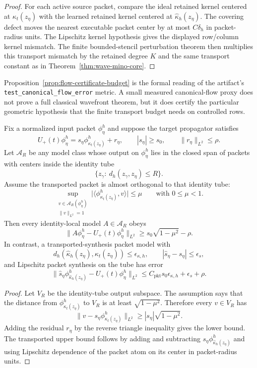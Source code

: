 \begin{proof}
For each active source packet, compare the ideal retained kernel centered at $\kappa_t(z_\eta)$ with the learned retained kernel centered at $\hat\kappa_h(z_\eta)$.  The covering defect moves the nearest executable packet center by at most $C\delta_h$ in packet-radius units.  The Lipschitz kernel hypothesis gives the displayed row/column kernel mismatch.  The finite bounded-stencil perturbation theorem then multiplies this transport mismatch by the retained degree $K$ and the same transport constant as in Theorem~\ref{thm:wave-mino-core}.
\end{proof}

Proposition~\ref{prop:flow-certificate-budget} is the formal reading of the artifact's \texttt{test\_canonical\_flow\_error} metric.  A small measured canonical-flow proxy does not prove a full classical wavefront theorem, but it does certify the particular geometric hypothesis that the finite transport budget needs on controlled rows.

\begin{proposition}
\label{prop:conditional-transport-advantage}
Fix a normalized input packet $\phi_\eta^h$ and suppose the target propagator satisfies
\[
U_+(t)\phi_\eta^h
=
s_\eta\phi_{\kappa_t(z_\eta)}^h+r_\eta,
\qquad
|s_\eta|\ge s_0,\qquad
\|r_\eta\|_{L^2}\le \rho .
\]
Let $\mathcal A_R$ be any model class whose output on $\phi_\eta^h$ lies in the closed span of packets with centers inside the identity tube
\[
\{z_\gamma:\ d_h(z_\gamma,z_\eta)\le R\}.
\]
Assume the transported packet is almost orthogonal to that identity tube:
\[
\sup_{\substack{v\in \mathcal A_R(\phi_\eta^h)\\ \|v\|_{L^2}=1}}
\bigl|\langle \phi_{\kappa_t(z_\eta)}^h,v\rangle\bigr|
\le \mu
\qquad
\text{with } 0\le\mu<1.
\]
Then every identity-local model $A\in\mathcal A_R$ obeys
\[
\|A\phi_\eta^h-U_+(t)\phi_\eta^h\|_{L^2}
\ge
s_0\sqrt{1-\mu^2}-\rho .
\]
In contrast, a transported-synthesis packet model with
\[
d_h(\hat\kappa_h(z_\eta),\kappa_t(z_\eta))\le\epsilon_{\kappa,h},
\qquad
|\hat s_\eta-s_\eta|\le \epsilon_s,
\]
and Lipschitz packet synthesis on the tube has error
\[
\|\hat s_\eta \phi_{\hat\kappa_h(z_\eta)}^h-U_+(t)\phi_\eta^h\|_{L^2}
\le
C_{\mathrm{pkt}}s_0\epsilon_{\kappa,h}
+
\epsilon_s
+
\rho .
\]
\end{proposition}

\begin{proof}
Let $V_R$ be the identity-tube output subspace.  The assumption says that the distance from $\phi_{\kappa_t(z_\eta)}^h$ to $V_R$ is at least $\sqrt{1-\mu^2}$.  Therefore every $v\in V_R$ has
\[
\|v-s_\eta\phi_{\kappa_t(z_\eta)}^h\|_{L^2}
\ge
|s_\eta|\sqrt{1-\mu^2}.
\]
Adding the residual $r_\eta$ by the reverse triangle inequality gives the lower bound.  The transported upper bound follows by adding and subtracting $s_\eta\phi_{\hat\kappa_h(z_\eta)}^h$ and using Lipschitz dependence of the packet atom on its center in packet-radius units.
\end{proof}


